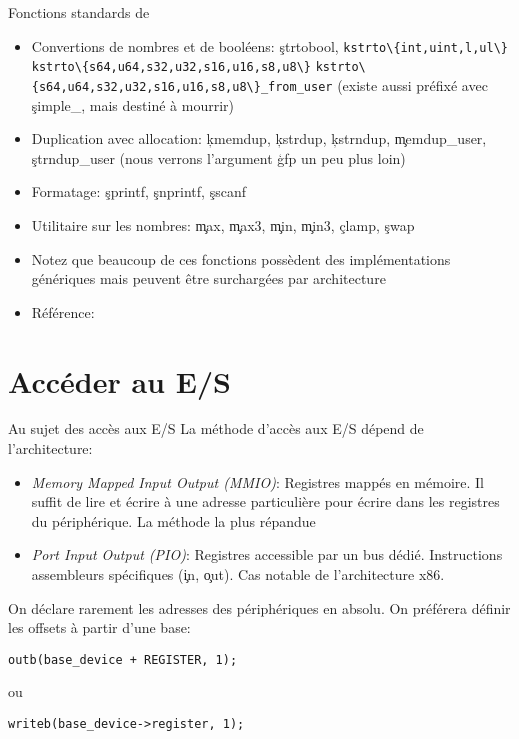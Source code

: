 \begin{frame}{Fonctions standards de }
  \begin{itemize}
  \item  Convertions   de  nombres  et   de  booléens:  \c{strtobool},
    \lstinline+kstrto\{int,uint,l,ul\}+
    \lstinline+kstrto\{s64,u64,s32,u32,s16,u16,s8,u8\}+
    \lstinline+kstrto\{s64,u64,s32,u32,s16,u16,s8,u8\}_from_user+
    (existe aussi préfixé avec \c{simple_}, mais destiné à mourrir)
  \item   Duplication  avec   allocation:   \c{kmemdup},  \c{kstrdup},
    \c{kstrndup},  \c{memdup_user},   \c{strndup_user}  (nous  verrons
    l'argument \c{gfp} un peu plus loin)
  \item Formatage: \c{sprintf}, \c{snprintf}, \c{sscanf}
  \item  Utilitaire  sur  les  nombres:  \c{max},  \c{max3},  \c{min},
    \c{min3}, \c{clamp}, \c{swap}
  \item   Notez  que   beaucoup   de  ces   fonctions  possèdent   des
    implémentations  génériques  mais  peuvent  être  surchargées  par
    architecture
  \item Référence:  
  \end{itemize}
\end{frame}

\section{Accéder au E/S}

\begin{frame}[fragile=singleslide]{Au sujet des accès aux E/S}
  La méthode d'accès aux E/S dépend de l'architecture:
  \begin{itemize}
  \item \emph{Memory Mapped Input  Output (MMIO)}: Registres mappés en
    mémoire.  Il suffit  de lire et écrire à  une adresse particulière
    pour écrire dans les registres du périphérique. La méthode la plus
    répandue
  \item \emph{Port  Input Output  (PIO)}: Registres accessible  par un
    bus   dédié.    Instructions   assembleurs  spécifiques   (\c{in},
    \c{out}).  Cas notable de l'architecture x86.
  \end{itemize}

  On déclare  rarement les adresses  des périphériques en  absolu.  On
  préférera définir les offsets à partir d'une base:
  \begin{lstlisting}
outb(base_device + REGISTER, 1);
  \end{lstlisting}
  ou
  \begin{lstlisting}
writeb(base_device->register, 1);
  \end{lstlisting}
\end{frame}

